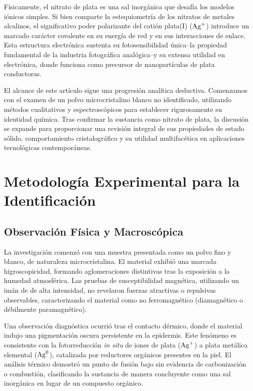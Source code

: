 \documentclass[pdflatex,sn-mathphys-num]{sn-jnl}
\theoremstyle{thmstyleone}%
\theoremstyle{thmstyletwo}%
\theoremstyle{thmstylethree}%
\begin{document}
Físicamente, el nitrato de plata es una sal inorgánica que desafía los modelos
iónicos simples. Si bien comparte la estequiometría de los nitratos de metales
alcalinos, el significativo poder polarizante del catión plata(I) ($\ce{Ag+}$)
introduce un marcado carácter covalente en su energía de red y en sus
interacciones de enlace. Esta estructura electrónica sustenta su fotosensibilidad
única--la propiedad fundamental de la industria fotográfica analógica--y su
extensa utilidad en electrónica, donde funciona como precursor de nanopartículas
de plata conductoras.

El alcance de este artículo sigue una progresión analítica deductiva. Comenzamos
con el examen de un polvo microcristalino blanco no identificado, utilizando
métodos cualitativos y espectroscópicos para establecer rigurosamente su
identidad química. Tras confirmar la sustancia como nitrato de plata, la
discusión se expande para proporcionar una revisión integral de sus propiedades
de estado sólido, comportamiento cristalográfico y su utilidad multifacética en
aplicaciones tecnológicas contemporáneas.

\section{Metodología Experimental para la Identificación}
\label{sec:methodology}

\subsection{Observación Física y Macroscópica}
La investigación comenzó con una muestra presentada como un polvo fino y blanco,
de naturaleza microcristalina. El material exhibió una marcada higroscopicidad,
formando aglomeraciones distintivas tras la exposición a la humedad atmosférica.
Las pruebas de susceptibilidad magnética, utilizando un imán de  de alta
intensidad, no revelaron fuerzas atractivas o repulsivas observables,
caracterizando el material como no ferromagnético (diamagnético o débilmente
paramagnético).

Una observación diagnóstica ocurrió tras el contacto dérmico, donde el material
indujo una pigmentación oscura persistente en la epidermis. Este fenómeno es
consistente con la fotorreducción \textit{in situ} de iones de plata
($\ce{Ag+}$) a plata metálica elemental ($\ce{Ag^0}$), catalizada por reductores
orgánicos presentes en la piel. El análisis térmico demostró un punto de fusión
bajo sin evidencia de carbonización o combustión, clasificando la sustancia de
manera concluyente como una sal inorgánica en lugar de un compuesto orgánico.
\end{document}
